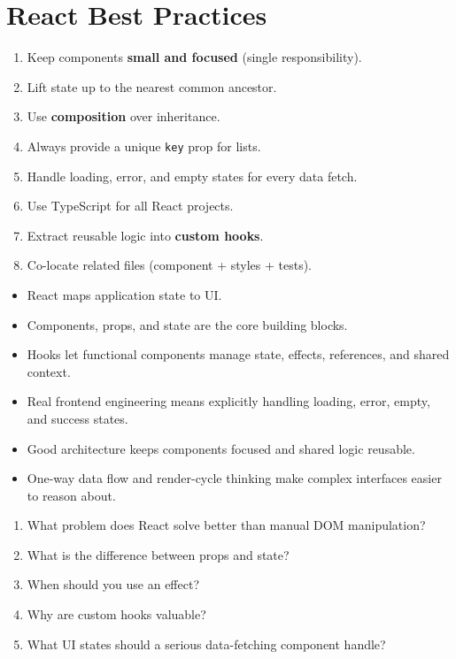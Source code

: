 \documentclass[12pt, a4paper, oneside]{book}
\begin{document}
\section{React Best Practices}
\begin{enumerate}[leftmargin=2em]
    \item Keep components \textbf{small and focused} (single responsibility).
    \item Lift state up to the nearest common ancestor.
    \item Use \textbf{composition} over inheritance.
    \item Always provide a unique \texttt{key} prop for lists.
    \item Handle loading, error, and empty states for every data fetch.
    \item Use TypeScript for all React projects.
    \item Extract reusable logic into \textbf{custom hooks}.
    \item Co-locate related files (component + styles + tests).
\end{enumerate}

\begin{summarybox}
\begin{itemize}[leftmargin=2em]
    \item React maps application state to UI.
    \item Components, props, and state are the core building blocks.
    \item Hooks let functional components manage state, effects, references, and shared context.
    \item Real frontend engineering means explicitly handling loading, error, empty, and success states.
    \item Good architecture keeps components focused and shared logic reusable.
    \item One-way data flow and render-cycle thinking make complex interfaces easier to reason about.
\end{itemize}
\end{summarybox}

\begin{recallbox}
\begin{enumerate}[leftmargin=2em]
    \item What problem does React solve better than manual DOM manipulation?
    \item What is the difference between props and state?
    \item When should you use an effect?
    \item Why are custom hooks valuable?
    \item What UI states should a serious data-fetching component handle?
\end{enumerate}
\end{recallbox}
\end{document}

